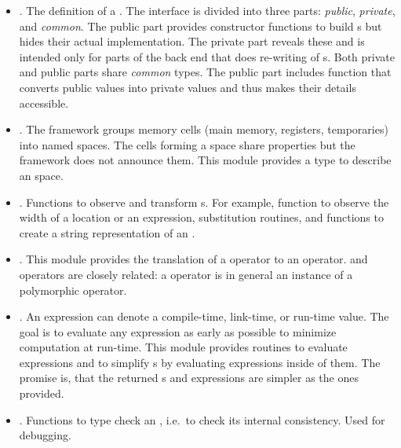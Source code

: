 \documentclass{article}%
\begin{document}
\begin{itemize}

\item {}. The definition of a {\rtl}. The interface is
divided into three parts:  \emph{public}, \emph{private}, and
\emph{common}.  The public part provides constructor functions to build
{\rtl}s but hides their actual implementation.  The private part reveals
these and is intended only for parts of the back end that does
re-writing of {\rtl}s.  Both private and public parts share
\emph{common} types.  The public part includes function that converts
public values into private values and thus makes their details
accessible. 

\item {}. The {\rtl} framework groups memory cells
(main memory, registers, temporaries) into named spaces. The cells
forming a space share properties but the {\rtl} framework does not
announce them. This module provides a type to describe an {\rtl} space. 


\item {}. Functions to observe and transform
{\rtl}s. For example, function to observe the width of a location or an
expression, substitution routines, and functions to create a string
representation of an {\rtl}.

\item {}. This module provides the translation of a
{\PAL} operator to an {\rtl} operator.  {\PAL} and {\rtl} operators are
closely related: a {\PAL} operator is in general an instance of a
polymorphic {\rtl} operator.

\item {}. An {\rtl} expression can denote a
compile-time, link-time, or run-time value. The goal is to evaluate any
{\rtl} expression as early as possible to minimize computation at
run-time. This module provides routines to evaluate {\rtl} expressions
and to simplify {\rtl}s by evaluating expressions inside of them. The
promise is, that the returned {\rtl}s and expressions are simpler as the
ones provided.

\item {}. Functions to type check an {\rtl},
i.e.~to check its internal consistency. Used for debugging.

\end{itemize}

\end{document}
